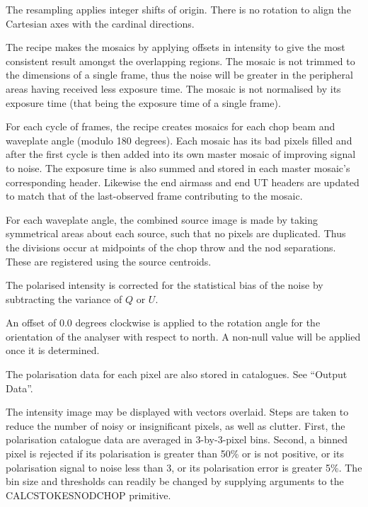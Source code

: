 \documentclass[twoside,11pt]{article}
\newcommand{\htmlref}[2]{#1}
\renewcommand{\_}{\texttt{\symbol{95}}}
\newcommand{\sstitem}{\item}
\begin{document}
{{{         \sstitem
         The resampling applies integer shifts of origin.  There is no
         rotation to align the Cartesian axes with the cardinal directions.

         \sstitem
         The recipe makes the mosaics by applying offsets in intensity
         to give the most consistent result amongst the overlapping regions.
         The mosaic is not trimmed to the dimensions of a single frame, thus
         the noise will be greater in the peripheral areas having received
         less exposure time.  The mosaic is not normalised by its exposure
         time (that being the exposure time of a single frame).

         \sstitem
         For each cycle of frames, the recipe creates mosaics for each
         chop beam and waveplate angle (modulo 180 degrees).  Each mosaic
         has its bad pixels filled and after the first cycle is then added
         into its own master mosaic of improving signal to noise.  The
         exposure time is also summed and stored in each master mosaic's
         corresponding header.  Likewise the end airmass and end UT headers
         are updated to match that of the last-observed frame contributing
         to the mosaic.

         \sstitem
         For each waveplate angle, the combined source image is made by
         taking symmetrical areas about each source, such that no pixels
         are duplicated.  Thus the divisions occur at midpoints of the chop
         throw and the nod separations.  These are registered using the
         source centroids.

         \sstitem
         The polarised intensity is corrected for the statistical bias
         of the noise by subtracting the variance of $Q$ or $U$.

         \sstitem
         An offset of 0.0 degrees clockwise is applied to the rotation
         angle for the orientation of the analyser with respect to north.
         A non-null value will be applied once it is determined.

         \sstitem
         The polarisation data for each pixel are also stored in
         catalogues.  See \htmlref{``Output Data''}{pnc_data}.

         \sstitem
         The intensity image may be displayed with vectors overlaid.
         Steps are taken to reduce the number of noisy or insignificant
         pixels, as well as clutter.  First, the polarisation catalogue data
         are averaged in 3-by-3-pixel bins.  Second, a binned pixel is
         rejected if its polarisation is greater than 50\% or is not positive,
         or its polarisation signal to noise less than 3, or its polarisation
         error is greater 5\%.  The bin size and thresholds can readily be
         changed by supplying arguments to the \_CALC\_STOKES\_NOD\_CHOP\_
         primitive.

}}}
\end{document}
